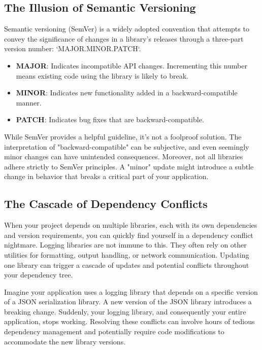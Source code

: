 \documentclass{article}
\begin{document}
{{{{\subsection*{The Illusion of Semantic Versioning}

Semantic versioning (SemVer) is a widely adopted convention that attempts to convey the significance of changes in a library's releases through a three-part version number: `MAJOR.MINOR.PATCH`.

\begin{itemize}
    \item \textbf{MAJOR}: Indicates incompatible API changes. Incrementing this number means existing code using the library is likely to break.
    \item \textbf{MINOR}: Indicates new functionality added in a backward-compatible manner.
    \item \textbf{PATCH}: Indicates bug fixes that are backward-compatible.
\end{itemize}

While SemVer provides a helpful guideline, it's not a foolproof solution. The interpretation of "backward-compatible" can be subjective, and even seemingly minor changes can have unintended consequences. Moreover, not all libraries adhere strictly to SemVer principles. A "minor" update might introduce a subtle change in behavior that breaks a critical part of your application.

\subsection*{The Cascade of Dependency Conflicts}

When your project depends on multiple libraries, each with its own dependencies and version requirements, you can quickly find yourself in a dependency conflict nightmare. Logging libraries are not immune to this. They often rely on other utilities for formatting, output handling, or network communication. Updating one library can trigger a cascade of updates and potential conflicts throughout your dependency tree.

Imagine your application uses a logging library that depends on a specific version of a JSON serialization library. A new version of the JSON library introduces a breaking change. Suddenly, your logging library, and consequently your entire application, stops working. Resolving these conflicts can involve hours of tedious dependency management and potentially require code modifications to accommodate the new library versions.

}}}}
\end{document}
